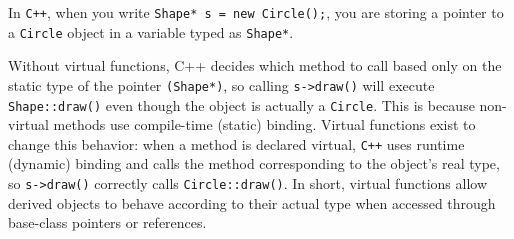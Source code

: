 \documentclass[../basic_programs.tex]{subfiles}
\begin{document}
  \begin{obs}
    In \lstinline|C++|, when you write \lstinline|Shape* s = new Circle();|, you are storing a pointer to a \lstinline|Circle| object in a variable typed as \lstinline|Shape*|. 
    
    Without virtual functions, C++ decides which method to call based only on the static type of the pointer \lstinline|(Shape*)|, so calling \lstinline|s->draw()| will execute \lstinline|Shape::draw()| even though the object is actually a \lstinline|Circle|. This is because non-virtual methods use compile-time (static) binding. Virtual functions exist to change this behavior: when a method is declared virtual, \lstinline|C++| uses runtime (dynamic) binding and calls the method corresponding to the object’s real type, so \lstinline|s->draw()| correctly calls \lstinline|Circle::draw()|. In short, virtual functions allow derived objects to behave according to their actual type when accessed through base-class pointers or references.
  \end{obs}
\end{document}
